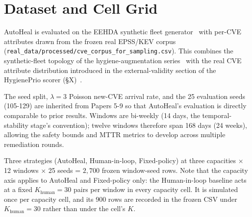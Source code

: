 \section{Dataset and Cell Grid}
\label{sec:dataset}

AutoHeal is evaluated on the EEHDA synthetic fleet
generator~\cite{paper4hygieneprio} with per-CVE attributes drawn from
the frozen real EPSS/KEV corpus
(\texttt{real\_data/\allowbreak processed/\allowbreak cve\_corpus\_for\_sampling.csv}). This
combines the synthetic-fleet topology of the hygiene-augmentation series~\cite{paper3hygienebench} with the
real CVE attribute distribution introduced in the external-validity
section of the HygienePrio scorer (\S X)~\cite{paper4hygieneprio}.



The seed split, $\lambda = 3$ Poisson new-CVE arrival rate, and
the 25 evaluation seeds (105-129) are inherited from Papers 5-9 so
that AutoHeal's evaluation is directly comparable to prior results.
Windows are bi-weekly (14 days, the temporal-stability stage's
convention); twelve windows therefore span
168 days (24 weeks), allowing
the safety bounds and MTTR metrics to develop across multiple
remediation rounds.

Three strategies (AutoHeal, Human-in-loop, Fixed-policy) at three
capacities $\times$ 12 windows $\times$ 25 seeds = $2{,}700$ frozen
window-seed rows. Note that the capacity axis applies to AutoHeal
and Fixed-policy only: the Human-in-loop baseline acts at a fixed
$K_{\text{human}} = 30$ pairs per window in every capacity cell.
It is simulated once per capacity cell, and its 900 rows are
recorded in the frozen CSV under $K_{\text{human}} = 30$ rather
than under the cell's $K$.
